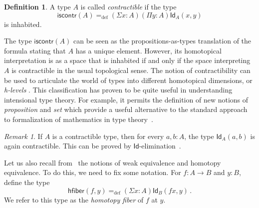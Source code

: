 \documentclass{article}
\newcommand{\defeq}{=_{\mathrm{def}}}
\newcommand{\Id}{\mathsf{Id}}
\newcommand{\id}[1]{\Id_{#1}}
\newcommand{\iscontr}{\mathsf{iscontr}}
\newcommand{\hfiber}{\mathsf{hfiber}}
\theoremstyle{remark}
\newtheorem{remark}[theorem]{Remark}
\theoremstyle{definition}
\newtheorem{definition}[theorem]{Definition}
\begin{document}
\begin{definition}  A type $A$ is called \emph{contractible} if the  type 
 \begin{equation}
 \label{eq:contractible}
\iscontr(A) \defeq (\Sigma x:A)(\Pi y:A)\id{A}(x,y)
\end{equation}
is inhabited.
\end{definition} 

The type $\iscontr(A)$ can be seen as the propositions-as-types translation
of the formula stating that $A$ has a unique element. However, its homotopical interpretation 
is as a space that is inhabited if and only if the space interpreting $A$ is contractible in the usual
topological sense. The notion of contractibility can be used to articulate the world of types into different homotopical dimensions, or \emph{h-levels} \cite{VoevodskyV:unifc}. This classification has proven to be quite useful in understanding intensional type theory.  
For example, it permits the definition of new notions of \emph{proposition} and \emph{set} which provide a useful alternative to the standard approach to formalization of mathematics in type theory~\cite{VoevodskyV:unifc}.

\begin{remark} \label{thm:idcontrcontr}
If $A$ is a contractible type, then for every $a, b : A$, the type $\id{A}(a,b)$ is again contractible. This can be proved  by $\Id$-elimination~\cite{AwodeyS:indtht}. 
\end{remark}

Let us also recall from~\cite{VoevodskyV:unifc} the notions of weak equivalence and homotopy equivalence. To do this, we need to fix some notation. For $f : A \rightarrow B$
and $y : B$, define the type
\[
 \hfiber(f,y) \defeq (\Sigma x : A) \id{B}(f x, y) \, .
\]
We refer to this type as the \emph{homotopy fiber} of $f$ at $y$. 
\end{document}
